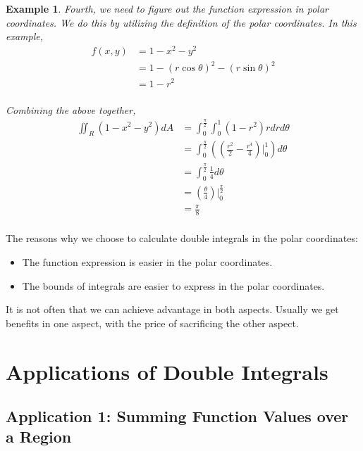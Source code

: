 \documentclass{article}
\newtheorem{example}{Example}
\begin{document}
\begin{example}
  Fourth, we need to figure out the function expression in polar coordinates. We 
  do this by utilizing the definition of the polar coordinates. In this example,
  \begin{equation*}
    \begin{split}
      f(x, y) &= 1 - x^2 - y^2 \\
              &= 1 - (r\cos\theta)^2 - (r\sin\theta)^2 \\
              &= 1 - r^2 \\
    \end{split}
  \end{equation*}

  Combining the above together,
  \begin{equation*}
    \begin{split}
      \iint_R (1 - x^2 - y^2) dA &= \int_0^\frac{\pi}{2} \int_0^1 (1 - r^2) r dr d\theta \\
                                 &= \int_0^\frac{\pi}{2} ((\frac{r^2}{2} - \frac{r^4}{4})|_0^1) d\theta \\
                                 &= \int_0^\frac{\pi}{2} \frac{1}{4} d\theta \\
                                 &= (\frac{\theta}{4})|_0^{\frac{\pi}{2}} \\
                                 &= \frac{\pi}{8} \\
    \end{split}
  \end{equation*}
\end{example}

The reasons why we choose to calculate double integrals in the polar coordinates:
\begin{itemize}
  \item The function expression is easier in the polar coordinates.
  \item The bounds of integrals are easier to express in the polar coordinates.
\end{itemize}

It is not often that we can achieve advantage in both aspects. Usually we get 
benefits in one aspect, with the price of sacrificing the other aspect.

\section{Applications of Double Integrals}

\subsection{Application 1: Summing Function Values over a Region}
\end{document}

